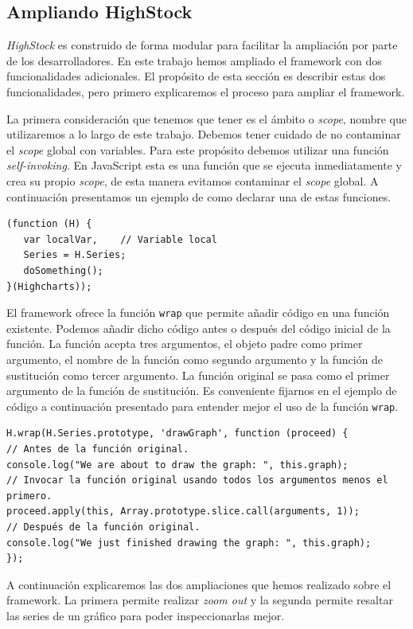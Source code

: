 	\subsection{Ampliando HighStock}
		\emph{HighStock} es construido de forma modular para facilitar la ampliación por parte de los desarrolladores. En este trabajo hemos ampliado
		el framework con dos funcionalidades adicionales. El propósito de esta sección es describir estas dos funcionalidades, pero primero
		explicaremos el proceso para ampliar el framework.
		\par
		La primera consideración que tenemos que tener es el ámbito o \emph{scope}, nombre que utilizaremos a lo largo de este trabajo.
		Debemos tener cuidado de no contaminar el \emph{scope} global con variables. Para este propósito debemos utilizar una función
		\emph{self-invoking}. En JavaScript esta es una función que se ejecuta inmediatamente y crea su propio \emph{scope}, de esta manera
		evitamos contaminar el \emph{scope} global. A continuación presentamos un ejemplo de como declarar una de estas funciones.
		\begin{lstlisting}[style=myJs]
(function (H) {
   var localVar,	// Variable local
   Series = H.Series;
   doSomething();
}(Highcharts));
		\end{lstlisting}
		\par
		El framework ofrece la función \texttt{wrap} que permite añadir código en una función existente. Podemos añadir dicho código antes o
		después del código inicial de la función. La función acepta tres argumentos, el objeto padre como primer argumento, el nombre de la
		función como segundo argumento y la función de sustitución como tercer argumento. La función original se pasa como el primer
		argumento de la función de sustitución. Es conveniente fijarnos en el ejemplo de código a continuación presentado para entender mejor
		el uso de la función \texttt{wrap}.
		\begin{lstlisting}[style=myJs]
H.wrap(H.Series.prototype, 'drawGraph', function (proceed) {
// Antes de la función original.
console.log("We are about to draw the graph: ", this.graph);
// Invocar la función original usando todos los argumentos menos el primero.
proceed.apply(this, Array.prototype.slice.call(arguments, 1));
// Después de la función original.
console.log("We just finished drawing the graph: ", this.graph);
});
		\end{lstlisting}
		\par  
		A continuación explicaremos las dos ampliaciones que hemos realizado sobre el framework. La primera permite realizar \emph{zoom out} y la
		segunda permite resaltar las series de un gráfico para poder inspeccionarlas mejor.
